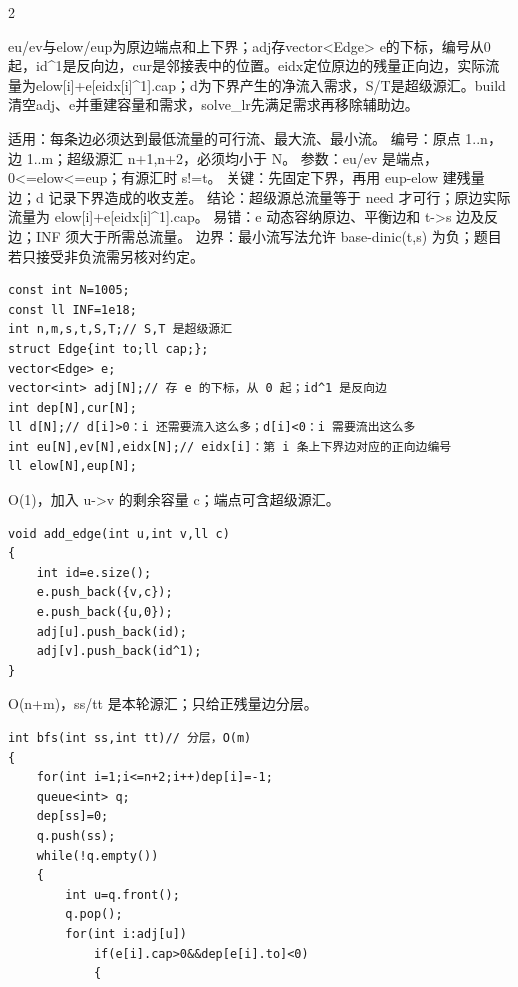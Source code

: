 \documentclass[UTF8,fontset=fandol,a4paper,twoside]{ctexart}
\newcommand{\note}[1]{{\fontsize{10}{12}\selectfont #1\par}}
\begin{document}
\begin{multicols}{2}
\note{eu/\allowbreak{}ev与elow/\allowbreak{}eup为原边端点和上下界；adj存vector<\allowbreak{}Edge>\allowbreak{} e的下标，编号从0起，id\textasciicircum{}1是反向边，cur是邻接表中的位置。eidx定位原边的残量正向边，实际流量为elow[\allowbreak{}i]\allowbreak{}+\allowbreak{}e[\allowbreak{}eidx[\allowbreak{}i]\allowbreak{}\textasciicircum{}1]\allowbreak{}.\allowbreak{}cap；d为下界产生的净流入需求，S/\allowbreak{}T是超级源汇。build清空adj、e并重建容量和需求，solve\_lr先满足需求再移除辅助边。}
\note{适用：每条边必须达到最低流量的可行流、最大流、最小流。 编号：原点 1.\allowbreak{}.\allowbreak{}n，边 1.\allowbreak{}.\allowbreak{}m；超级源汇 n+\allowbreak{}1,\allowbreak{}n+\allowbreak{}2，必须均小于 N。 参数：eu/\allowbreak{}ev 是端点，0<\allowbreak{}=\allowbreak{}elow<\allowbreak{}=\allowbreak{}eup；有源汇时 s!=\allowbreak{}t。 关键：先固定下界，再用 eup-\allowbreak{}elow 建残量边；d 记录下界造成的收支差。 结论：超级源总流量等于 need 才可行；原边实际流量为 elow[\allowbreak{}i]\allowbreak{}+\allowbreak{}e[\allowbreak{}eidx[\allowbreak{}i]\allowbreak{}\textasciicircum{}1]\allowbreak{}.\allowbreak{}cap。 易错：e 动态容纳原边、平衡边和 t-\allowbreak{}>\allowbreak{}s 边及反边；INF 须大于所需总流量。 边界：最小流写法允许 base-\allowbreak{}dinic(\allowbreak{}t,\allowbreak{}s)\allowbreak{} 为负；题目若只接受非负流需另核对约定。}
\begin{lstlisting}
const int N=1005;
const ll INF=1e18;
int n,m,s,t,S,T;// S,T 是超级源汇
struct Edge{int to;ll cap;};
vector<Edge> e;
vector<int> adj[N];// 存 e 的下标，从 0 起；id^1 是反向边
int dep[N],cur[N];
ll d[N];// d[i]>0：i 还需要流入这么多；d[i]<0：i 需要流出这么多
int eu[N],ev[N],eidx[N];// eidx[i]：第 i 条上下界边对应的正向边编号
ll elow[N],eup[N];
\end{lstlisting}
\note{O(\allowbreak{}1)\allowbreak{}，加入 u-\allowbreak{}>\allowbreak{}v 的剩余容量 c；端点可含超级源汇。}
\begin{lstlisting}
void add_edge(int u,int v,ll c)
{
    int id=e.size();
    e.push_back({v,c});
    e.push_back({u,0});
    adj[u].push_back(id);
    adj[v].push_back(id^1);
}
\end{lstlisting}
\note{O(\allowbreak{}n+\allowbreak{}m)\allowbreak{}，ss/\allowbreak{}tt 是本轮源汇；只给正残量边分层。}
\begin{lstlisting}
int bfs(int ss,int tt)// 分层，O(m)
{
    for(int i=1;i<=n+2;i++)dep[i]=-1;
    queue<int> q;
    dep[ss]=0;
    q.push(ss);
    while(!q.empty())
    {
        int u=q.front();
        q.pop();
        for(int i:adj[u])
            if(e[i].cap>0&&dep[e[i].to]<0)
            {

\end{lstlisting}
\end{multicols}
\end{document}
